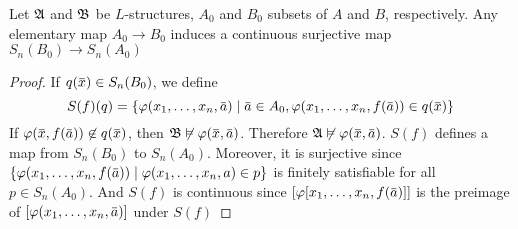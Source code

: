 \documentclass[11pt]{article}
\begin{document}
\begin{lemma}[]
Let \(\mathfrak{A}\) and \(\mathfrak{B}\) be \(L\)-structures, \(A_0\) and \(B_0\) subsets of
\(A\) and \(B\), respectively. Any elementary map \(A_0\to B_0\) induces a
continuous surjective map \(S_n(B_0)\to S_n(A_0)\)
\end{lemma}

\begin{proof}
If \(q(\bbar{x})\in S_n(B_0)\), we define
\begin{equation*}
S(f)(q)=\{\varphi(x_1,\dots,x_n,\bbar{a})\mid\bbar{a}\in A_0,\varphi(x_1,\dots,x_n,f(\bbar{a}))\in q(\bbar{x})\}
\end{equation*}
If \(\varphi(\bbar{x},f(\bbar{a}))\not\in q(\bbar{x})\), then
\(\fB\not\vDash\varphi(\bbar{x},\bbar{a})\). Therefore \(\fA\not\vDash\varphi(\bbar{x},\bbar{a})\).
\(S(f)\) defines a map from \(S_n(B_0)\) to \(S_n(A_0)\). Moreover, it is
surjective since
\(\{\varphi(x_1,\dots,x_n,f(\bbar{a}))\mid\varphi(x_1,\dots,x_n,a)\in p\}\) is
finitely satisfiable for all \(p\in S_n(A_0)\). And \(S(f)\) is continuous
since \([\varphi[x_1,\dots,x_n,f(\bbar{a})]]\) is the preimage of
\([\varphi(x_1,\dots,x_n,\bbar{a})]\) under \(S(f)\)
\end{proof}
\end{document}
